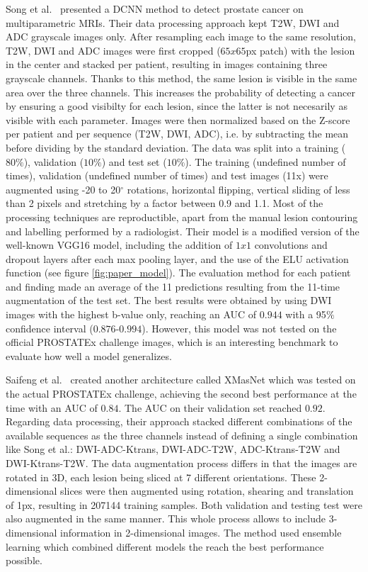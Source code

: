 Song et al.~\cite{07} presented a DCNN method to detect prostate cancer on multiparametric MRIs. Their data processing approach kept T2W, DWI and ADC grayscale images only. After resampling each image to the same resolution, T2W, DWI and ADC images were first cropped ($65x65$px patch) with the lesion in the center and stacked per patient, resulting in images containing three grayscale channels. Thanks to this method, the same lesion is visible in the same area over the three channels. This increases the probability of detecting a cancer by ensuring a good visibilty for each lesion, since the latter is not necesarily as visible with each parameter. Images were then normalized based on the Z-score per patient and per sequence (T2W, DWI, ADC), i.e. by subtracting the mean before dividing by the standard deviation. The data was split into a training ($80\%$), validation ($10\%$) and test set ($10\%$). The training (undefined number of times), validation (undefined number of times) and test images (11x) were augmented using -20 to 20$^\circ$ rotations, horizontal flipping, vertical sliding of less than 2 pixels and stretching by a factor between 0.9 and 1.1. Most of the processing techniques are reproductible, apart from the manual lesion contouring and labelling performed by a radiologist. 
Their model is a modified version of the well-known VGG16 model, including the addition of $1x1$ convolutions and dropout layers after each max pooling layer, and the use of the ELU activation function (see figure \ref{fig:paper_model}). The evaluation method for each patient and finding made an average of the 11 predictions resulting from the 11-time augmentation of the test set. The best results were obtained by using DWI images with the highest b-value only, reaching an AUC of $0.944$ with a 95$\%$ confidence interval ($0.876$-$0.994$). However, this model was not tested on the official PROSTATEx challenge images, which is an interesting benchmark to evaluate how well a model generalizes.

Saifeng et al.~\cite{31} created another architecture called XMasNet which was tested on the actual PROSTATEx challenge, achieving the second best performance at the time with an AUC of $0.84$. The AUC on their validation set reached $0.92$. Regarding data processing, their approach stacked different combinations of the available sequences as the three channels instead of defining a single combination like Song et al.: DWI-ADC-Ktrans, DWI-ADC-T2W, ADC-Ktrans-T2W and DWI-Ktrans-T2W. The data augmentation process differs in that the images are rotated in 3D, each lesion being sliced at 7 different orientations. These 2-dimensional slices were then augmented using rotation, shearing and translation of 1px, resulting in 207144 training samples. Both validation and testing test were also augmented in the same manner. This whole process allows to include 3-dimensional information in 2-dimensional images. The method used ensemble learning which combined different models the reach the best performance possible. 

